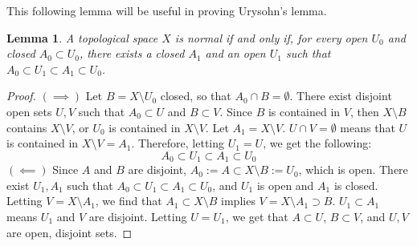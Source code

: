 \documentclass[openany, amssymb, psamsfonts]{amsart}
\newtheorem{lem}{Lemma}[section]
\theoremstyle{definition}
\numberwithin{equation}{section}
\begin{document}
This following lemma will be useful in proving Urysohn's lemma.

\begin{lem} \label{lem:3.9}
  A topological space $X$ is normal if and only if, for every open $U_0$ and closed $A_0 \subset U_0$, there exists a closed $A_1$ and an open $U_1$ such that $A_0 \subset U_1 \subset A_1 \subset U_0$.
\end{lem}
\begin{proof}
  $(\implies)$ Let $B = X \setminus U_0$ closed, so that $A_0 \cap B = \emptyset$. There exist disjoint open sets $U,V$ such that $A_0 \subset U$ and $B \subset V$. Since $B$ is contained in $V$, then $X \setminus B$ contains $X \setminus V$, or $U_0$ is contained in $X\setminus V$. Let $A_1 = X \setminus V$. $U\cap V = \emptyset$ means that $U$ is contained in $X\setminus V = A_1$. Therefore, letting $U_1 = U$, we get the following:
  \[
    A_0 \subset U_1 \subset A_1 \subset U_0
  \]
  $(\impliedby)$ Since $A$ and $B$ are disjoint, $A_0 := A \subset X \setminus B := U_0$, which is open. There exist $U_1, A_1$ such that $A_0 \subset U_1 \subset A_1 \subset U_0$, and $U_1$ is open and $A_1$ is closed. Letting $V = X \setminus A_1$, we find that $A_1 \subset X \setminus B$ implies $V = X \setminus A_1 \supset B$. $U_1\subset A_1$ means $U_1$ and $V$ are disjoint. Letting $U = U_1$, we get that $A \subset U$, $B\subset V$, and $U,V$ are open, disjoint sets.
\end{proof}
\end{document}
